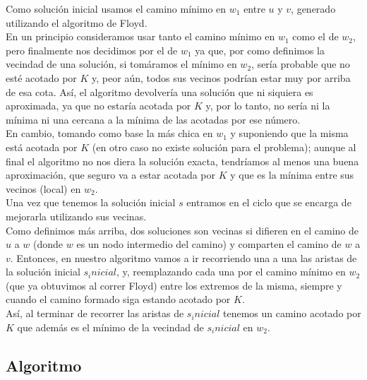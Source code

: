 Como soluci\'on inicial usamos el camino m\'inimo en $w_1$ entre $u$ y $v$, generado utilizando el algoritmo de Floyd.\\
En un principio consideramos usar tanto el camino m\'inimo en $w_1$ como el de $w_2$, pero finalmente nos decidimos por el de $w_1$ ya que, por como definimos la vecindad de una soluci\'on, si tom\'aramos el m\'inimo en $w_2$, ser\'ia probable que no est\'e acotado por $K$ y, peor a\'un, todos sus vecinos podr\'ian estar muy por arriba de esa cota. As\'i, el algoritmo devolver\'ia una soluci\'on que ni siquiera es aproximada, ya que no estar\'ia acotada por $K$ y, por lo tanto, no ser\'ia ni la m\'inima ni una cercana a la m\'inima de las acotadas por ese n\'umero.\\
En cambio, tomando como base la m\'as chica en $w_1$ y suponiendo que la misma est\'a acotada por $K$ (en otro caso no existe soluci\'on para el problema); aunque al final el algoritmo no nos diera la soluci\'on exacta, tendr\'iamos al menos una buena aproximaci\'on, que seguro va a estar acotada por $K$ y que es la m\'inima entre sus vecinos (local) en $w_2$.\\
Una vez que tenemos la soluci\'on inicial $s$ entramos en el ciclo que se encarga de mejorarla utilizando sus vecinas.\\
Como definimos m\'as arriba, dos soluciones son vecinas si difieren en el camino de $u$ a $w$ (donde $w$ es un nodo intermedio del camino) y comparten el camino de $w$ a $v$. Entonces, en nuestro algoritmo vamos a ir recorriendo una a una las aristas de la soluci\'on inicial $s_inicial$, y, reemplazando cada una por el camino m\'inimo en $w_2$ (que ya obtuvimos al correr Floyd) entre los extremos de la misma, siempre y cuando el camino formado siga estando acotado por $K$.\\ 
As\'i, al terminar de recorrer las aristas de $s_inicial$ tenemos un camino acotado por $K$ que adem\'as es el m\'inimo de la vecindad de $s_inicial$ en $w_2$.\\

\newpage
\subsection{Algoritmo}